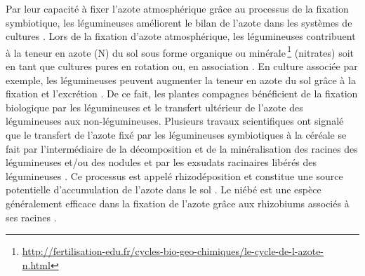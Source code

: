 \documentclass[a4paper,11pt]{article}
\begin{document}
Par leur capacité à fixer l'azote atmosphérique grâce au processus de
la fixation symbiotique, les légumineuses améliorent le bilan de
l'azote dans les systèmes de cultures
\cite{Ndakidemi_2005,Fustec11}. Lors de la fixation d'azote
atmosphérique, les légumineuses contribuent à la teneur en azote (N)
du sol sous forme organique ou
minérale\,\footnote{\url{http://fertilisation-edu.fr/cycles-bio-geo-chimiques/le-cycle-de-l-azote-n.html}}
(nitrates) soit en tant que cultures pures en rotation ou, en
association \cite{Bado_2006,Chu_2004,Makoi_2009,Ndakidemi_2005}. En
culture associée par exemple, les légumineuses peuvent augmenter la
teneur en azote du sol grâce à la fixation et l'excrétion
\cite{Trenbath_1976,Fustec11}. De ce fait, les plantes compagnes
bénéficient de la fixation biologique par les légumineuses et le
transfert ultérieur de l'azote des légumineuses aux
non-légumineuses. Plusieurs travaux scientifiques ont signalé que le
transfert de l'azote fixé par les légumineuses symbiotiques à la
céréale se fait par l'intermédiaire de la décomposition et de la
minéralisation des racines des légumineuses et/ou des nodules
\cite{Burity_1989} et par les exsudats racinaires libérés des
légumineuses \cite{Ndakidemi_2005,Makoi_2009}. Ce processus est appelé
rhizodéposition\cite{Fustec11} et constitue une source potentielle
d'accumulation de l'azote dans le sol \cite{Koulibi_FideleZONGO}. Le
niébé est une espèce généralement efficace dans la fixation de l'azote
grâce aux rhizobiums associés à ses racines \cite{TRAORE_2009}.

\newpage



\end{document}
